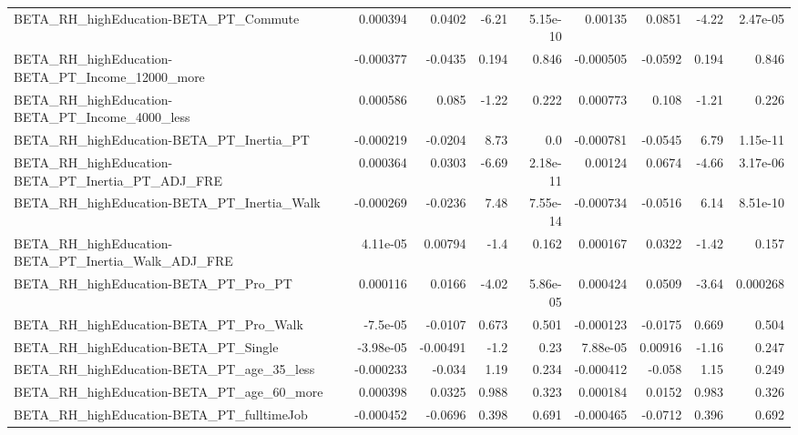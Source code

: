 \begin{tabular}{lrrrrrrrr}
BETA\_RH\_highEducation-BETA\_PT\_Commute              &    0.000394 &       0.0402 &    -6.21 & 5.15e-10 &    0.00135 &      0.0851 &        -4.22 &      2.47e-05 \\
BETA\_RH\_highEducation-BETA\_PT\_Income\_12000\_more    &   -0.000377 &      -0.0435 &    0.194 &    0.846 &  -0.000505 &     -0.0592 &        0.194 &         0.846 \\
BETA\_RH\_highEducation-BETA\_PT\_Income\_4000\_less     &    0.000586 &        0.085 &    -1.22 &    0.222 &   0.000773 &       0.108 &        -1.21 &         0.226 \\
BETA\_RH\_highEducation-BETA\_PT\_Inertia\_PT           &   -0.000219 &      -0.0204 &     8.73 &      0.0 &  -0.000781 &     -0.0545 &         6.79 &      1.15e-11 \\
BETA\_RH\_highEducation-BETA\_PT\_Inertia\_PT\_ADJ\_FRE   &    0.000364 &       0.0303 &    -6.69 & 2.18e-11 &    0.00124 &      0.0674 &        -4.66 &      3.17e-06 \\
BETA\_RH\_highEducation-BETA\_PT\_Inertia\_Walk         &   -0.000269 &      -0.0236 &     7.48 & 7.55e-14 &  -0.000734 &     -0.0516 &         6.14 &      8.51e-10 \\
BETA\_RH\_highEducation-BETA\_PT\_Inertia\_Walk\_ADJ\_FRE &    4.11e-05 &      0.00794 &     -1.4 &    0.162 &   0.000167 &      0.0322 &        -1.42 &         0.157 \\
BETA\_RH\_highEducation-BETA\_PT\_Pro\_PT               &    0.000116 &       0.0166 &    -4.02 & 5.86e-05 &   0.000424 &      0.0509 &        -3.64 &      0.000268 \\
BETA\_RH\_highEducation-BETA\_PT\_Pro\_Walk             &    -7.5e-05 &      -0.0107 &    0.673 &    0.501 &  -0.000123 &     -0.0175 &        0.669 &         0.504 \\
BETA\_RH\_highEducation-BETA\_PT\_Single               &   -3.98e-05 &     -0.00491 &     -1.2 &     0.23 &   7.88e-05 &     0.00916 &        -1.16 &         0.247 \\
BETA\_RH\_highEducation-BETA\_PT\_age\_35\_less          &   -0.000233 &       -0.034 &     1.19 &    0.234 &  -0.000412 &      -0.058 &         1.15 &         0.249 \\
BETA\_RH\_highEducation-BETA\_PT\_age\_60\_more          &    0.000398 &       0.0325 &    0.988 &    0.323 &   0.000184 &      0.0152 &        0.983 &         0.326 \\
BETA\_RH\_highEducation-BETA\_PT\_fulltimeJob          &   -0.000452 &      -0.0696 &    0.398 &    0.691 &  -0.000465 &     -0.0712 &        0.396 &         0.692 \\

\end{tabular}
